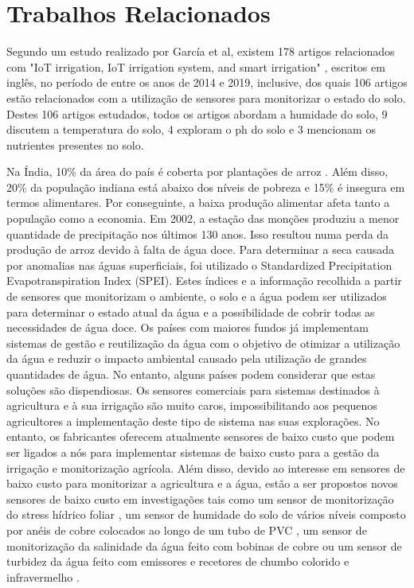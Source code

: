 \documentclass[conference]{IEEEtran}
\begin{document}
\section{Trabalhos Relacionados}

Segundo um estudo realizado por García et al, existem 178 artigos 
relacionados com  "IoT irrigation, IoT irrigation system, and smart 
irrigation" \cite{garcia2020iot}, escritos em inglês, no período de entre os 
anos de 2014 e 2019, inclusive, dos quais 106 artigos estão relacionados com a 
utilização de sensores para monitorizar o estado do solo. Destes 106 artigos 
estudados, todos os artigos abordam a humidade do solo, 9 discutem a temperatura 
do solo, 4 exploram o ph do solo e 3 mencionam os nutrientes presentes no solo.

Na Índia, 10\% da área do país é coberta por plantações de arroz \cite{zampieri2018surface}. 
Além disso, 20\% da população indiana está 
abaixo dos níveis de pobreza e 15\% é insegura em termos alimentares. 
Por conseguinte, a baixa produção alimentar afeta tanto a população como a economia. 
Em 2002, a estação das monções produziu a menor quantidade de precipitação nos 
últimos 130 anos. Isso resultou numa perda da produção de arroz devido à falta 
de água doce. Para determinar a seca causada por anomalias nas águas superficiais, 
foi utilizado o Standardized Precipitation Evapotranspiration Index (SPEI). 
Estes índices e a informação recolhida a partir de sensores que monitorizam o ambiente, 
o solo e a água podem ser utilizados para determinar o estado atual da água e a 
possibilidade de cobrir todas as necessidades de água doce. Os países com maiores 
fundos já implementam sistemas de gestão e reutilização da água com o objetivo de 
otimizar a utilização da água e reduzir o impacto ambiental causado pela utilização 
de grandes quantidades de água. No entanto, alguns países podem considerar que estas 
soluções são dispendiosas. 
Os sensores comerciais para sistemas destinados à agricultura e à sua irrigação 
são muito caros, impossibilitando aos pequenos agricultores a implementação deste 
tipo de sistema nas suas explorações. No entanto, os fabricantes oferecem atualmente 
sensores de baixo custo que podem ser ligados a nós para implementar sistemas de baixo 
custo para a gestão da irrigação e monitorização agrícola. Além disso, devido ao interesse 
em sensores de baixo custo para monitorizar a agricultura e a água, estão a ser propostos 
novos sensores de baixo custo em investigações tais como um sensor de monitorização do 
stress hídrico foliar \cite{daskalakis2018}, um sensor de humidade do solo de vários níveis composto 
por anéis de cobre colocados ao longo de um tubo de PVC \cite{guruprasadh2017intelligent}, 
um sensor de monitorização da salinidade da água feito com bobinas de 
cobre \cite{parra2013low} ou um sensor de turbidez da água 
feito com emissores e recetores de chumbo colorido e infravermelho \cite{sendra2013low}.
\end{document}
